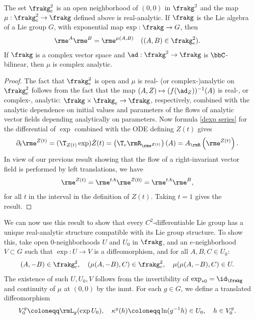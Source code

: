 \begin{thm}[{{\cite[Thm.~1.6.1]{DK}}}]
    The set $\frakg_e^2$ is an open neighborhood of $(0,0)$ in $\frakg^2$ and the map $\mu:\frakg_e^2\to \frakg$ defined above is real-analytic. If $\frakg$ is the Lie algebra of a Lie group $G$, with exponential map $\exp:\frakg\to G$, then
    \[\rme^A \rme^B=\rme^{\mu(A,B)}\quad ((A,B)\in\frakg_e^2).\label{eq 1.6.4 DK}\]
    If $\frakg$ is a complex vector space and $\ad:\frakg^2\to \frakg$ is $\bbC$-bilinear, then $\mu$ is complex analytic.
\end{thm}
\begin{proof}
    The fact that $\frakg_e^2$ is open and $\mu$ is real- (or complex-)analytic on $\frakg_e^2$ follows from the fact that the map $(A,Z)\mapsto (f(\ad_Z))^{-1}(A)$ is real-, or complex-, analytic: $\frakg\times\frakg_e\to \frakg$, respectively, combined with the analytic dependence on initial values and parameters of the flows of analytic vector fields depending analytically on parameters. Now formula \eqref{dexp series} for the differential of $\exp$ combined with the ODE defining $Z(t)$ gives
    \[\partial_t \rme^{Z(t)}=(\T_{Z(t)}\exp )\dot Z(t)=\left(\T_e \rmR_{\rme^{Z(t)}}\right)(A)=A_\rmR\left(\rme^{Z(t)}\right).\label{eq 1.6.5 DK}\]
    In view of our previous result showing that the flow of a right-invariant vector field is performed by left translations, we have
    \[\rme^{Z(t)}=\rme^{tA}\rme^{Z(0)}=\rme^{tA}\rme^B,\label{8284}\]
    for all $t$ in the interval in the definition of $Z(t)$. Taking $t=1$ gives the result.
\end{proof}

We can now use this result to show that every $C^2$-differentiable Lie group has a unique real-analytic structure compatible with its Lie group structure. To show this, take open $0$-neighborhoods $U$ and $U_0$ in $\frakg$, and an $e$-neighborhood $V\subset G$ such that $\exp:U\to V$ is a diffeomorphism, and for all $A,B,C\in U_0$:
\[(A,-B)\in\frakg_e^2,\quad (\mu(A,-B),C)\in\frakg_e^2,\quad \mu(\mu(A,-B),C)\in U.\]
The existence of such $U,U_0,V$ follows from the invertibility of $\exp_{\ast 0}=\id_\frakg$ and continuity of $\mu$ at $(0,0)$ by the \gls{inmt}. For each $g\in G$, we define a translated diffeomorphism
\[V_0^g\coloneqq \rmL_g(\exp U_0),\quad \kappa^g(h)\coloneqq \ln(g^{-1}h)\in U_0,\quad h\in V^g_0.\]

